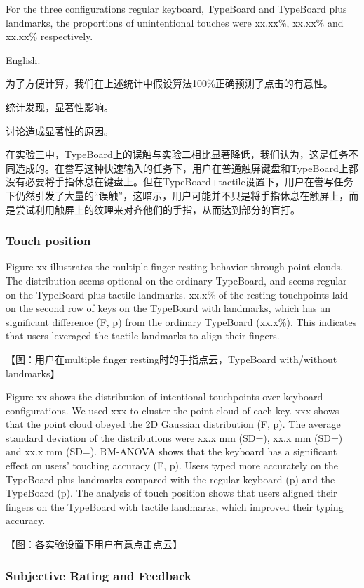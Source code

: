 For the three configurations regular keyboard, TypeBoard and TypeBoard plus landmarks, the proportions of unintentional touches were xx.xx\%, xx.xx\% and xx.xx\% respectively.

English.

为了方便计算，我们在上述统计中假设算法100\%正确预测了点击的有意性。

统计发现，显著性影响。

讨论造成显著性的原因。

在实验三中，TypeBoard上的误触与实验二相比显著降低，我们认为，这是任务不同造成的。在誊写这种快速输入的任务下，用户在普通触屏键盘和TypeBoard上都没有必要将手指休息在键盘上。但在TypeBoard+tactile设置下，用户在誊写任务下仍然引发了大量的“误触”，这暗示，用户可能并不只是将手指休息在触屏上，而是尝试利用触屏上的纹理来对齐他们的手指，从而达到部分的盲打。

\subsubsection{Touch position}

Figure xx illustrates the multiple finger resting behavior through point clouds. The distribution seems optional on the ordinary TypeBoard, and seems regular on the TypeBoard plus tactile landmarks. xx.x\% of the resting touchpoints laid on the second row of keys on the TypeBoard with landmarks, which has an significant difference (F, p) from the ordinary TypeBoard (xx.x\%). This indicates that users leveraged the tactile landmarks to align their fingers.

【图：用户在multiple finger resting时的手指点云，TypeBoard with/without landmarks】

Figure xx shows the distribution of intentional touchpoints over keyboard configurations. We used xxx to cluster the point cloud of each key. xxx shows that the point cloud obeyed the 2D Gaussian distribution (F, p). The average standard deviation of the distributions were xx.x mm (SD=), xx.x mm (SD=) and xx.x mm (SD=). RM-ANOVA shows that the keyboard has a significant effect on users' touching accuracy (F, p). Users typed more accurately on the TypeBoard plus landmarks compared with the regular keyboard (p) and the TypeBoard (p). The analysis of touch position shows that users aligned their fingers on the TypeBoard with tactile landmarks, which improved their typing accuracy.

【图：各实验设置下用户有意点击点云】

\subsubsection{Subjective Rating and Feedback}

